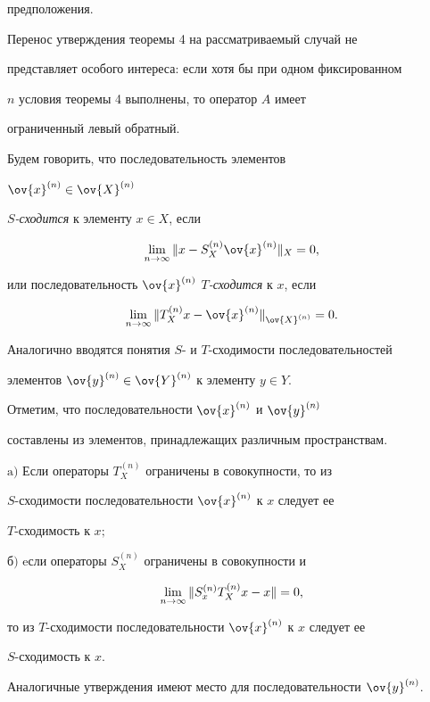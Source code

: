 предположения.





Перенос утверждения теоремы 4 на рассматриваемый случай не


представляет особого интереса: если хотя бы при одном фиксированном


$n$ условия теоремы 4 выполнены, то оператор $A$ имеет


ограниченный левый обратный.





Будем говорить, что последовательность элементов


$\ov{x}^{(n)}\in\ov{X}^{(n)}$\;


$S${\it -сходится} к элементу $x\in X$, если


$$


\lim\limits_{n\to\infty}\nr{x-S^{(n)}_X\ov{x}^{(n)}}_X=0,


$$


или последовательность $\ov{x}^{(n)}$ $T${\it -сходится} к $x$, если


$$


\lim\limits_{n\to\infty}\nr{T^{(n)}_Xx-\ov{x}^{(n)}}_{\ov{X}^{(n)}}=0.


$$


Аналогично вводятся понятия $S$- и $T$-сходимости последовательностей


элементов $\ov{y}^{(n)}\in\ov{Y}^{(n)}$ к элементу $y\in Y$.


Отметим, что последовательности $\ov{x}^{(n)}$ и $\ov{y}^{(n)}$


составлены из элементов, принадлежащих различным пространствам.





\begin{lem}


$\mathrm{a)}$ Если операторы $T^{(n)}_X$ ограничены в совокупности, то из


$S$-сходимости последовательности $\ov{x}^{(n)}$ к $x$ следует ее


$T$-сходимость к $x;$







$б)$ eсли операторы $S^{(n)}_X$ ограничены в совокупности и


\begin{equation}


\lim_{n\to\infty}\nr{S^{(n)}_xT^{(n)}_Xx-x}=0,


\end{equation}


то из $T$-сходимости последовательности $\ov{x}^{(n)}$ к $x$ следует ее


$S$-сходимость к $x$.


Аналогичные утверждения имеют место для последовательности $\ov{y}^{(n)}$.


\end{lem}






